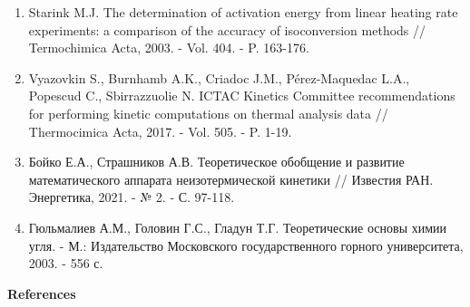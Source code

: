 \begin{enumerate}
\item
Starink M.J. The determination of activation energy from linear
heating rate experiments: a comparison of the accuracy of isoconversion
methods // Termochimica Acta, 2003. - Vol. 404. - P. 163-176.

\item
Vyazovkin S., Burnhamb A.K., Criadoc J.M., Pérez-Maquedac L.A.,
Popescud C., Sbirrazzuolie N. ICTAC Kinetics Committee recommendations
for performing kinetic computations on thermal analysis data //
Thermocimica Acta, 2017. - Vol. 505. - P. 1-19.

\item
Бойко Е.А., Страшников А.В. Теоретическое обобщение и развитие
математического аппарата неизотермической кинетики // Известия РАН.
Энергетика, 2021. - № 2. - С. 97-118.

\item
Гюльмалиев А.М., Головин Г.С., Гладун Т.Г. Теоретические основы
химии угля. - М.: Издательство Московского государственного горного
университета, 2003. - 556 с.
\end{enumerate}

\begin{center}
{\bfseries References}
\end{center}

